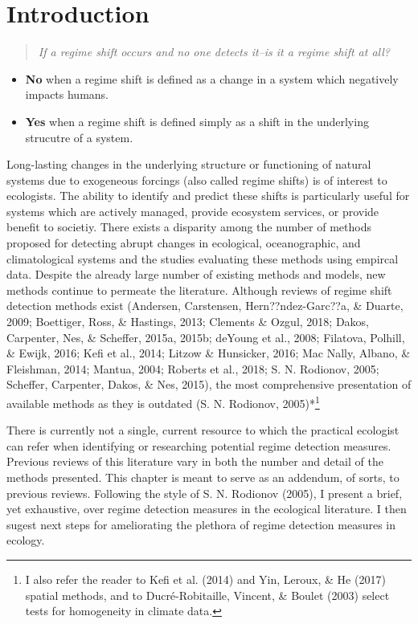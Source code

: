 \documentclass[12pt,twoside,openany]{reedthesis}
\providecommand{\tightlist}{%
  \setlength{\itemsep}{0pt}\setlength{\parskip}{0pt}}
\begin{document}
\section{Introduction}\label{introduction}
\begin{quote}
\emph{If a regime shift occurs and no one detects it--is it a regime
shift at all?}
\end{quote}
\begin{itemize}
\tightlist
\item
  \textbf{No} when a regime shift is defined as a change in a system
  which negatively impacts humans.
\item
  \textbf{Yes} when a regime shift is defined simply as a shift in the
  underlying strucutre of a system.
\end{itemize}
Long-lasting changes in the underlying structure or functioning of
natural systems due to exogeneous forcings (also called regime shifts)
is of interest to ecologists. The ability to identify and predict these
shifts is particularly useful for systems which are actively managed,
provide ecosystem services, or provide benefit to societiy. There exists
a disparity among the number of methods proposed for detecting abrupt
changes in ecological, oceanographic, and climatological systems and the
studies evaluating these methods using empircal data. Despite the
already large number of existing methods and models, new methods
continue to permeate the literature. Although reviews of regime shift
detection methods exist (Andersen, Carstensen, Hern??ndez-Garc??a, \&
Duarte, 2009; Boettiger, Ross, \& Hastings, 2013; Clements \& Ozgul,
2018; Dakos, Carpenter, Nes, \& Scheffer, 2015a, 2015b; deYoung et al.,
2008; Filatova, Polhill, \& Ewijk, 2016; Kefi et al., 2014; Litzow \&
Hunsicker, 2016; Mac Nally, Albano, \& Fleishman, 2014; Mantua, 2004;
Roberts et al., 2018; S. N. Rodionov, 2005; Scheffer, Carpenter, Dakos,
\& Nes, 2015), the most comprehensive presentation of available methods
as they is outdated (S. N. Rodionov, 2005)*\footnote{I also refer the
  reader to Kefi et al. (2014) and Yin, Leroux, \& He (2017) spatial
  methods, and to Ducré-Robitaille, Vincent, \& Boulet (2003) select
  tests for homogeneity in climate data.}

There is currently not a single, current resource to which the practical
ecologist can refer when identifying or researching potential regime
detection measures. Previous reviews of this literature vary in both the
number and detail of the methods presented. This chapter is meant to
serve as an addendum, of sorts, to previous reviews. Following the style
of S. N. Rodionov (2005), I present a brief, yet exhaustive, over regime
detection measures in the ecological literature. I then sugest next
steps for ameliorating the plethora of regime detection measures in
ecology.
\end{document}
